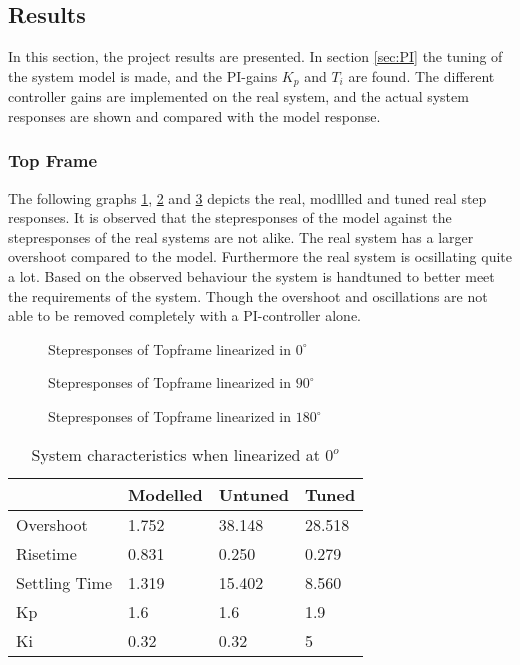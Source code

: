 \documentclass[../../Main]{subfiles}
\begin{document}
\subsection{Results}
\label{sec:results}
In this section, the project results are presented. In section \ref{sec:PI} the tuning of the system model is made, and the PI-gains $K_p$ and $T_i$ are found. The different controller gains are implemented on the real system, and the actual system responses are shown and compared
with the model response.

\subsubsection{Top Frame}
\label{sec:top_frame_results}

The following graphs \ref{fig:top_0}, \ref{fig:top_90} and \ref{fig:top_180} depicts the real, modllled and tuned real step responses.
It is observed that the stepresponses of the model against the stepresponses of the real
systems are not alike. The real system has a larger overshoot compared to the model.
Furthermore the real system is ocsillating quite a lot. Based on the observed behaviour
the system is handtuned to better meet the requirements of the system. Though the
overshoot and oscillations are not able to be removed completely with a PI-controller
alone.


\begin{figure}[H]
  \def\svgwidth{\textwidth}
  
  \caption{Stepresponses of Topframe linearized in $0^{\circ}$}
  \label{fig:top_0}
\end{figure}


\begin{figure}[H]	
  \def\svgwidth{\textwidth}
  
  \caption{Stepresponses of Topframe linearized in $90^{\circ}$}
  \label{fig:top_90}
\end{figure}

\begin{figure}[H]
  \def\svgwidth{\textwidth}
  
  \caption{Stepresponses of Topframe linearized in $180^{\circ}$}
  \label{fig:top_180}
\end{figure}



\begin{table}[H]
	\centering
	\begin{tabular}{l|*{3}{l}}
		&Modelled&Untuned&Tuned\\
		\hline
		Overshoot&1.752&38.148&28.518\\
		Risetime&0.831&0.250&0.279\\
		Settling Time&1.319&15.402&8.560\\
		Kp&1.6&1.6&1.9\\
		Ki&0.32&0.32&5
	\end{tabular}
	\caption{System characteristics when linearized at $0^o$}
	\label{tab:0_top}
\end{table}
\end{document}
